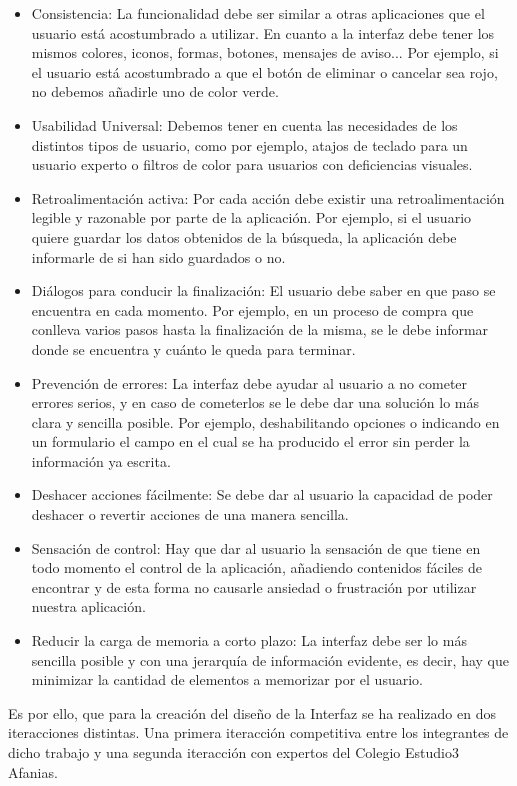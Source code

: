 \begin{itemize} 
	\item Consistencia: La funcionalidad debe ser similar a otras aplicaciones que el usuario está acostumbrado a utilizar. En cuanto a la interfaz debe tener los mismos colores, iconos, formas, botones, mensajes de aviso... Por ejemplo, si el usuario está acostumbrado a que el botón de eliminar o cancelar sea rojo, no debemos añadirle uno de color verde.
	\item Usabilidad Universal: Debemos tener en cuenta las necesidades de los distintos tipos de usuario, como por ejemplo, atajos de teclado para un usuario experto o filtros de color para usuarios con deficiencias visuales.
	\item Retroalimentación activa: Por cada acción debe existir una retroalimentación legible y razonable por parte de la aplicación. Por ejemplo, si el usuario quiere guardar los datos obtenidos de la búsqueda, la aplicación debe informarle de si han sido guardados o no.
	\item Diálogos para conducir la finalización: El usuario debe saber en que paso se encuentra en cada momento. Por ejemplo, en un proceso de compra que conlleva varios pasos hasta la finalización de la misma, se le debe informar donde se encuentra y cuánto le queda para terminar.
	\item Prevención de errores: La interfaz debe ayudar al usuario a no cometer errores serios, y en caso de cometerlos se le debe dar una solución lo más clara y sencilla posible. Por ejemplo, deshabilitando opciones o indicando en un formulario el campo en el cual se ha producido el error sin perder la información ya escrita.
	\item Deshacer acciones fácilmente: Se debe dar al usuario la capacidad de poder deshacer o revertir acciones de una manera sencilla. 
	\item Sensación de control: Hay que dar al usuario la sensación de que tiene en todo momento el control de la aplicación, añadiendo contenidos fáciles de encontrar y de esta forma no causarle ansiedad o frustración por utilizar nuestra aplicación.
	\item Reducir la carga de memoria a corto plazo: La interfaz debe ser lo más sencilla posible y con una jerarquía de información evidente, es decir, hay que minimizar la cantidad de elementos a memorizar por el usuario.
\end{itemize}
Es por ello, que para la creación del diseño de la Interfaz se ha realizado en dos iteracciones distintas. Una primera iteracción competitiva entre los integrantes de dicho trabajo y una segunda iteracción con expertos del Colegio Estudio3 Afanias. 

